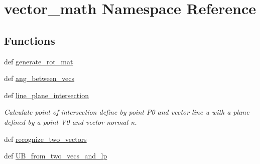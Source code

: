 \hypertarget{namespacevector__math}{\section{vector\-\_\-math Namespace Reference}
\label{namespacevector__math}
}
\subsection*{Functions}
\begin{DoxyCompactItemize}
\item 
def \hyperlink{namespacevector__math_a899b2e7ed6182b63a24b6ce25a73cf97}{generate\-\_\-rot\-\_\-mat}
\item 
def \hyperlink{namespacevector__math_a8c31bca05acf1a3504ee5e380f13eb1f}{ang\-\_\-between\-\_\-vecs}
\item 
def \hyperlink{namespacevector__math_a2470550ad7b87d69dca5b3d5f23b77f0}{line\-\_\-plane\-\_\-intersection}
\begin{DoxyCompactList}\small\item\em Calculate point of intersection define by point P0 and vector line u with a plane defined by a point V0 and vector normal n. \end{DoxyCompactList}\item 
def \hyperlink{namespacevector__math_ac1382d387da395b0fd84ea8f188e4337}{recognize\-\_\-two\-\_\-vectors}
\item 
def \hyperlink{namespacevector__math_a26674a535147589c31445095f0c7fb84}{U\-B\-\_\-from\-\_\-two\-\_\-vecs\-\_\-and\-\_\-lp}
\end{DoxyCompactItemize}


